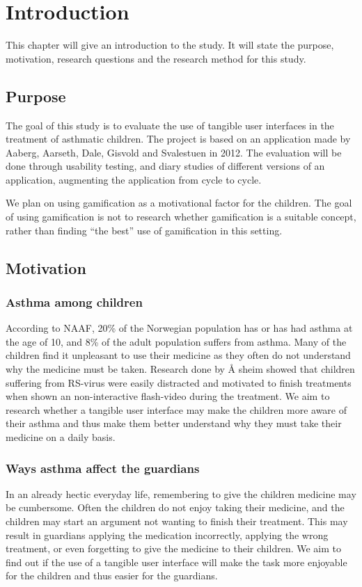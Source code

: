 \chapter{Introduction}
\label{chp:introduction}

This chapter will give an introduction to the study. It will state the purpose, motivation, research questions and the research method for this study. 

\section{Purpose}
\label{sec:purpose}
The goal of this study is to evaluate the use of tangible user interfaces in the treatment of asthmatic children. The project is based on an application made by Aaberg, Aarseth, Dale, Gisvold and Svalestuen \cite{CustomerDriven} in 2012.
The evaluation will be done through usability testing, and diary studies of different versions of an application, augmenting the application from cycle to cycle. 

We plan on using gamification as a motivational factor for the children. The goal of using gamification is not to research whether gamification is a suitable concept, rather than finding ``the best'' use of gamification in this setting.


\section{Motivation}
\label{sec:motivation}

\subsection{Asthma among children}
According to NAAF, 20\% \cite{NAAF} of the Norwegian population has or has had asthma at the age of 10, and 8\% of the adult population suffers from asthma. Many of the children find it unpleasant to use their medicine as they often do not understand why the medicine must be taken. Research done by \r{A} sheim \cite{Asheim610877} showed that children suffering from RS-virus were easily distracted and motivated to finish treatments when shown an non-interactive flash-video during the treatment. We aim to research whether a tangible user interface may make the children more aware of their asthma and thus make them better understand why they must take their medicine on a daily basis. 


\subsection{Ways asthma affect the guardians}
In an already hectic everyday life, remembering to give the children medicine may be cumbersome. Often the children do not enjoy taking their medicine, and the children may start an argument not wanting to finish their treatment. This may result in guardians applying the medication incorrectly, applying the wrong treatment, or even forgetting to give the medicine to their children. We aim to find out if the use of a tangible user interface will make the task more enjoyable for the children and thus easier for the guardians. 



